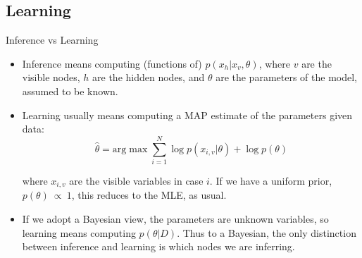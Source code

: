 \documentclass[10pt,mathserif]{beamer}
\begin{document}
\subsection{Learning}
\begin{frame}{Inference vs Learning}
\begin{itemize}
    \item Inference means computing (functions of) $p(x_h|x_v,\theta)$, where $v$ are the visible nodes, $h$ are the hidden nodes, and $\theta$ are the parameters of the model, assumed to be known. 
    \item Learning usually means computing a MAP estimate of the parameters given data: 
    \begin{equation}
        \hat{\theta} = \text{arg}\max \sum_{i=1}^N\log p(x_{i,v}|\theta) + \log p(\theta)
    \end{equation} 
    
    where $x_{i,v}$ are the visible variables in case $i$. If we have a uniform prior, $p(\theta)\ \propto \ 1$, this reduces to the MLE, as usual. 
    
    \item If we adopt a Bayesian view, the parameters are unknown variables, so learning means computing $p(\theta|D)$. Thus to a Bayesian, the only distinction between inference and learning is which nodes we are inferring.
\end{itemize} 
\end{frame}
\end{document}
